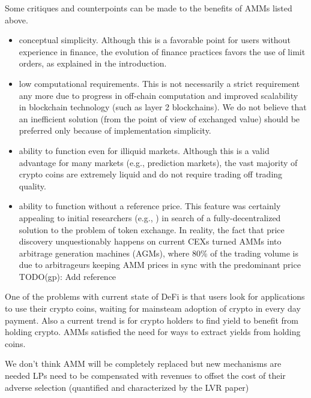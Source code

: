 \documentclass[11pt, reqno]{amsart}
\theoremstyle{definition}
\theoremstyle{remark}
\begin{document}
Some critiques and counterpoints can be made to the benefits of AMMs listed above.
\begin{itemize}
	\item conceptual simplicity. Although this is a favorable point for users
	      without experience in finance, the evolution of finance practices favors the
	      use of limit orders, as explained in the introduction.
	\item low computational requirements. This is not necessarily a strict
	      requirement any more due to progress in off-chain computation and
          improved scalability in blockchain technology (such as layer 2
          blockchains). We do not believe that an inefficient solution (from
          the point of view of exchanged value) should be preferred only
          because of implementation simplicity.
	\item ability to function even for illiquid markets.
	      Although this is a valid advantage for many markets (e.g., prediction markets),
	      the vast majority of crypto coins are extremely liquid and do not require
	      trading off trading quality.
	\item ability to function without a reference price.
          This feature was certainly appealing to initial researchers (e.g., \cite{Bu17})
	      in search of a fully-decentralized solution to the problem
	      of token exchange. In reality, the fact that price discovery unquestionably
	      happens on current CEXs turned AMMs into arbitrage generation machines
	      (AGMs), where 80\% of the trading volume is due to arbitrageurs keeping AMM
	      prices in sync with the predominant price TODO(gp): Add reference
\end{itemize}

One of the problems with current state of DeFi is that users look for
applications to use their crypto coins, waiting for mainsteam adoption of
crypto in every day payment.
Also a current trend is for crypto holders to find yield to benefit from
holding crypto. AMMs satisfied the need for ways to extract yields from holding
coins.

We don't think AMM will be completely replaced but new mechanisms are needed LPs
need to be compensated with revenues to offset the cost of their adverse
selection (quantified and characterized by the LVR paper)
\end{document}
